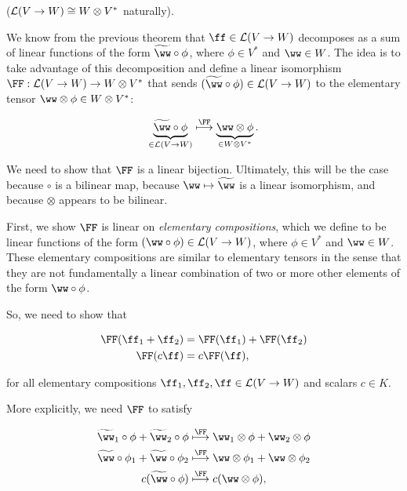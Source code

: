 \begin{deriv}
    ($\mathcal{L}(V \rightarrow W) \cong W \otimes V^*$ naturally).
    
    We know from the previous theorem that $\ff \in \LLLL(V \rightarrow W)$ decomposes as a sum of linear functions of the form $\tww \circ \phi$, where $\phi \in V^*$ and $\ww \in W$. The idea is to take advantage of this decomposition and define a linear isomorphism $\FF:\LLLL(V \rightarrow W) \rightarrow W \otimes V^*$ that sends ${(\tww \circ \phi) \in \LLLL(V \rightarrow W)}$ to the elementary tensor $\ww \otimes \phi \in W \otimes V^*$:
    
    \begin{align*}
        \underbrace{\tww \circ \phi}_{\in \LLLL(V \rightarrow W)} \overset{\FF}{\longmapsto} \underbrace{\ww \otimes \phi}_{\in W \otimes V^*}.
    \end{align*}
    
    We need to show that $\FF$ is a linear bijection. Ultimately, this will be the case because $\circ$ is a bilinear map, because $\ww \mapsto \tww$ is a linear isomorphism, and because $\otimes$ appears to be bilinear.
    
    First, we show $\FF$ is linear on \textit{elementary compositions}, which we define to be linear functions of the form $(\ww \circ \phi) \in \LLLL(V \rightarrow W)$, where $\phi \in V^*$ and $\ww \in W$. These elementary compositions are similar to elementary tensors in the sense that they are not fundamentally a linear combination of two or more other elements of the form $\ww \circ \phi$.
    
    So, we need to show that
    
    \begin{align*}
        \FF(\ff_1 + \ff_2) &= \FF(\ff_1) + \FF(\ff_2) \\
        \FF(c\ff) &= c\FF(\ff),
    \end{align*}
    
    for all elementary compositions $\ff_1, \ff_2, \ff \in \LLLL(V \rightarrow W)$ and scalars $c \in K$.
    
    More explicitly, we need $\FF$ to satisfy
    
    \begin{align*}
        \tww_1 \circ \phi + \tww_2 \circ \phi 
        &\overset{\FF}{\longmapsto}
        \ww_1 \otimes \phi + \ww_2 \otimes \phi
        \\
        \tww \circ \phi_1 + \tww \circ \phi_2 
        &\overset{\FF}{\longmapsto}
        \ww \otimes \phi_1 + \ww \otimes \phi_2
        \\
        c (\tww \circ \phi)
        &\overset{\FF}{\longmapsto}
        c (\ww \otimes \phi),
    \end{align*}
    

\end{deriv}
